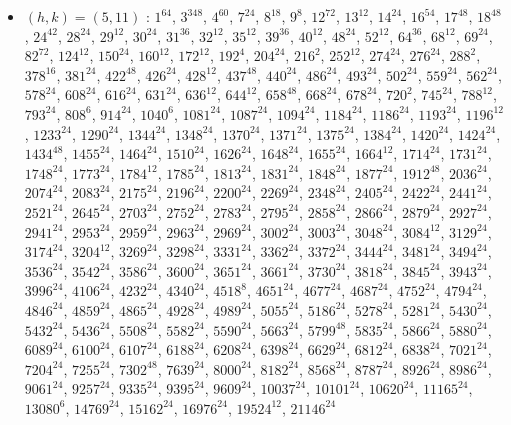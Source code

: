 \begin{itemize}
\item $(h,k)=(5,11)$ : $1^{64}$, $3^{348}$, $4^{60}$, $7^{24}$, $8^{18}$, $9^{8}$, $12^{72}$, $13^{12}$, $14^{24}$, $16^{54}$, $17^{48}$, $18^{48}$, $24^{42}$, $28^{24}$, $29^{12}$, $30^{24}$, $31^{36}$, $32^{12}$, $35^{12}$, $39^{36}$, $40^{12}$, $48^{24}$, $52^{12}$, $64^{36}$, $68^{12}$, $69^{24}$, $82^{72}$, $124^{12}$, $150^{24}$, $160^{12}$, $172^{12}$, $192^{4}$, $204^{24}$, $216^{2}$, $252^{12}$, $274^{24}$, $276^{24}$, $288^{2}$, $378^{16}$, $381^{24}$, $422^{48}$, $426^{24}$, $428^{12}$, $437^{48}$, $440^{24}$, $486^{24}$, $493^{24}$, $502^{24}$, $559^{24}$, $562^{24}$, $578^{24}$, $608^{24}$, $616^{24}$, $631^{24}$, $636^{12}$, $644^{12}$, $658^{48}$, $668^{24}$, $678^{24}$, $720^{2}$, $745^{24}$, $788^{12}$, $793^{24}$, $808^{6}$, $914^{24}$, $1040^{6}$, $1081^{24}$, $1087^{24}$, $1094^{24}$, $1184^{24}$, $1186^{24}$, $1193^{24}$, $1196^{12}$, $1233^{24}$, $1290^{24}$, $1344^{24}$, $1348^{24}$, $1370^{24}$, $1371^{24}$, $1375^{24}$, $1384^{24}$, $1420^{24}$, $1424^{24}$, $1434^{48}$, $1455^{24}$, $1464^{24}$, $1510^{24}$, $1626^{24}$, $1648^{24}$, $1655^{24}$, $1664^{12}$, $1714^{24}$, $1731^{24}$, $1748^{24}$, $1773^{24}$, $1784^{12}$, $1785^{24}$, $1813^{24}$, $1831^{24}$, $1848^{24}$, $1877^{24}$, $1912^{48}$, $2036^{24}$, $2074^{24}$, $2083^{24}$, $2175^{24}$, $2196^{24}$, $2200^{24}$, $2269^{24}$, $2348^{24}$, $2405^{24}$, $2422^{24}$, $2441^{24}$, $2521^{24}$, $2645^{24}$, $2703^{24}$, $2752^{24}$, $2783^{24}$, $2795^{24}$, $2858^{24}$, $2866^{24}$, $2879^{24}$, $2927^{24}$, $2941^{24}$, $2953^{24}$, $2959^{24}$, $2963^{24}$, $2969^{24}$, $3002^{24}$, $3003^{24}$, $3048^{24}$, $3084^{12}$, $3129^{24}$, $3174^{24}$, $3204^{12}$, $3269^{24}$, $3298^{24}$, $3331^{24}$, $3362^{24}$, $3372^{24}$, $3444^{24}$, $3481^{24}$, $3494^{24}$, $3536^{24}$, $3542^{24}$, $3586^{24}$, $3600^{24}$, $3651^{24}$, $3661^{24}$, $3730^{24}$, $3818^{24}$, $3845^{24}$, $3943^{24}$, $3996^{24}$, $4106^{24}$, $4232^{24}$, $4340^{24}$, $4518^{8}$, $4651^{24}$, $4677^{24}$, $4687^{24}$, $4752^{24}$, $4794^{24}$, $4846^{24}$, $4859^{24}$, $4865^{24}$, $4928^{24}$, $4989^{24}$, $5055^{24}$, $5186^{24}$, $5278^{24}$, $5281^{24}$, $5430^{24}$, $5432^{24}$, $5436^{24}$, $5508^{24}$, $5582^{24}$, $5590^{24}$, $5663^{24}$, $5799^{48}$, $5835^{24}$, $5866^{24}$, $5880^{24}$, $6089^{24}$, $6100^{24}$, $6107^{24}$, $6188^{24}$, $6208^{24}$, $6398^{24}$, $6629^{24}$, $6812^{24}$, $6838^{24}$, $7021^{24}$, $7204^{24}$, $7255^{24}$, $7302^{48}$, $7639^{24}$, $8000^{24}$, $8182^{24}$, $8568^{24}$, $8787^{24}$, $8926^{24}$, $8986^{24}$, $9061^{24}$, $9257^{24}$, $9335^{24}$, $9395^{24}$, $9609^{24}$, $10037^{24}$, $10101^{24}$, $10620^{24}$, $11165^{24}$, $13080^{6}$, $14769^{24}$, $15162^{24}$, $16976^{24}$, $19524^{12}$, $21146^{24}$

\end{itemize}
